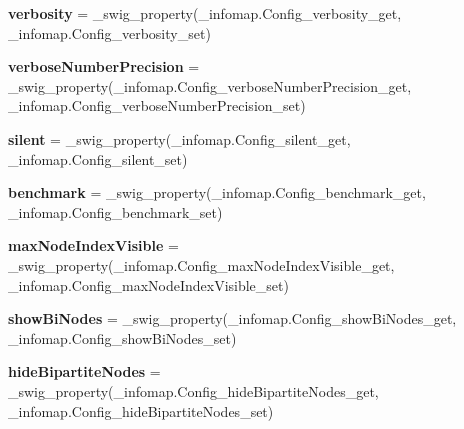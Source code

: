 \begin{DoxyCompactItemize}
{\bfseries verbosity} = \+\_\+swig\+\_\+property(\+\_\+infomap.\+Config\+\_\+verbosity\+\_\+get, \+\_\+infomap.\+Config\+\_\+verbosity\+\_\+set)
\item 
\mbox{\label{classdsmacc_1_1graph_1_1infomap_1_1Config_a89eb1b7b624b496126e17bf2bfc4748a}} 
{\bfseries verbose\+Number\+Precision} = \+\_\+swig\+\_\+property(\+\_\+infomap.\+Config\+\_\+verbose\+Number\+Precision\+\_\+get, \+\_\+infomap.\+Config\+\_\+verbose\+Number\+Precision\+\_\+set)
\item 
\mbox{\label{classdsmacc_1_1graph_1_1infomap_1_1Config_a87c883984f7280d973874cec3dce5471}} 
{\bfseries silent} = \+\_\+swig\+\_\+property(\+\_\+infomap.\+Config\+\_\+silent\+\_\+get, \+\_\+infomap.\+Config\+\_\+silent\+\_\+set)
\item 
\mbox{\label{classdsmacc_1_1graph_1_1infomap_1_1Config_a9650254b0a6713b720f7abfa7ac42c31}} 
{\bfseries benchmark} = \+\_\+swig\+\_\+property(\+\_\+infomap.\+Config\+\_\+benchmark\+\_\+get, \+\_\+infomap.\+Config\+\_\+benchmark\+\_\+set)
\item 
\mbox{\label{classdsmacc_1_1graph_1_1infomap_1_1Config_ae9688f9b316b53da3ff817929b1868a1}} 
{\bfseries max\+Node\+Index\+Visible} = \+\_\+swig\+\_\+property(\+\_\+infomap.\+Config\+\_\+max\+Node\+Index\+Visible\+\_\+get, \+\_\+infomap.\+Config\+\_\+max\+Node\+Index\+Visible\+\_\+set)
\item 
\mbox{\label{classdsmacc_1_1graph_1_1infomap_1_1Config_abd072395c6aad8cf7d7dbb817043f727}} 
{\bfseries show\+Bi\+Nodes} = \+\_\+swig\+\_\+property(\+\_\+infomap.\+Config\+\_\+show\+Bi\+Nodes\+\_\+get, \+\_\+infomap.\+Config\+\_\+show\+Bi\+Nodes\+\_\+set)
\item 
\mbox{\label{classdsmacc_1_1graph_1_1infomap_1_1Config_a4c7fd6a506ca651972e3784797b88180}} 
{\bfseries hide\+Bipartite\+Nodes} = \+\_\+swig\+\_\+property(\+\_\+infomap.\+Config\+\_\+hide\+Bipartite\+Nodes\+\_\+get, \+\_\+infomap.\+Config\+\_\+hide\+Bipartite\+Nodes\+\_\+set)
\item 
\mbox{\label{classdsmacc_1_1graph_1_1infomap_1_1Config_a882ae0ca48e372744fc2940d470e6126}} 

\end{DoxyCompactItemize}
